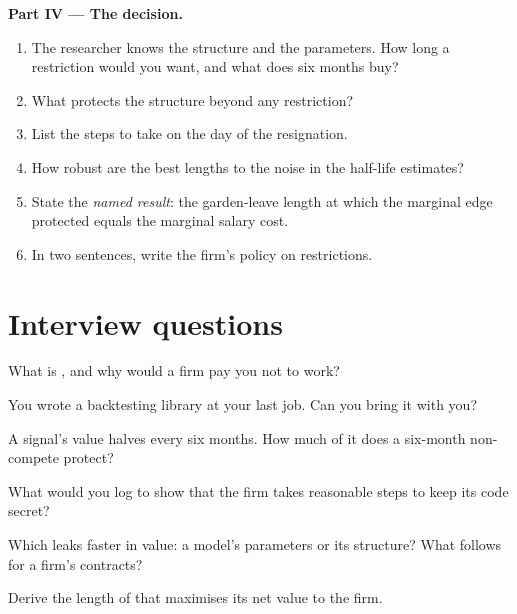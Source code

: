 \begin{problem}
\medskip\noindent\textbf{Part IV --- The decision.}
\begin{enumerate}[resume]
\item The researcher knows the structure and the parameters. How long a restriction would you want, and what does six months buy?
\item What protects the structure beyond any restriction?
\item List the steps to take on the day of the resignation.
\item How robust are the best lengths to the noise in the half-life estimates?
\item State the \emph{named result}: the garden-leave length at which the marginal edge protected equals the marginal salary cost.
\item In two sentences, write the firm's policy on restrictions.
\end{enumerate}
\end{problem}

\section{Interview questions}

\begin{interviewq}\label{iq:fm:intellectual-property-and-non-competes:1}
What is , and why would a firm pay you not to work?
\end{interviewq}

\begin{interviewq}\label{iq:fm:intellectual-property-and-non-competes:2}
You wrote a backtesting library at your last job. Can you bring it with you?
\end{interviewq}

\begin{interviewq}\label{iq:fm:intellectual-property-and-non-competes:3}
A signal's value halves every six months. How much of it does a six-month non-compete protect?
\end{interviewq}

\begin{interviewq}\label{iq:fm:intellectual-property-and-non-competes:4}
What would you log to show that the firm takes reasonable steps to keep its code secret?
\end{interviewq}

\begin{interviewq}\label{iq:fm:intellectual-property-and-non-competes:5}
Which leaks faster in value: a model's parameters or its structure? What follows for a firm's contracts?
\end{interviewq}

\begin{interviewq}\label{iq:fm:intellectual-property-and-non-competes:6}
Derive the length of  that maximises its net value to the firm.
\end{interviewq}

